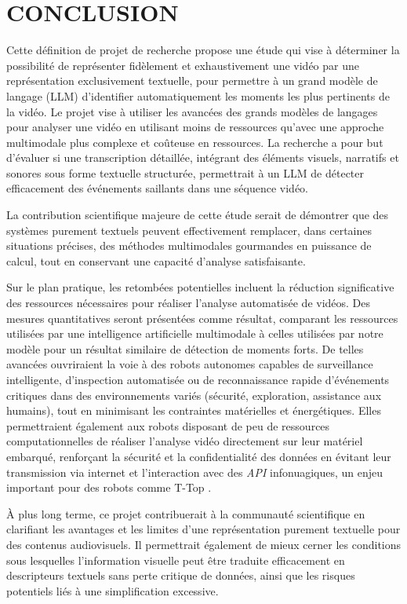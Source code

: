 \chapter{CONCLUSION}
Cette définition de projet de recherche propose une étude qui vise à déterminer la possibilité de représenter fidèlement et exhaustivement une vidéo par une représentation exclusivement textuelle, pour permettre à un grand modèle de langage (LLM) d'identifier automatiquement les moments les plus pertinents de la vidéo. Le projet vise à utiliser les avancées des grands modèles de langages pour analyser une vidéo en utilisant moins de ressources qu'avec une approche multimodale plus complexe et coûteuse en ressources. La recherche a pour but d'évaluer si une transcription détaillée, intégrant des éléments visuels, narratifs et sonores sous forme textuelle structurée, permettrait à un LLM de détecter efficacement des événements saillants dans une séquence vidéo. 

La contribution scientifique majeure de cette étude serait de démontrer que des systèmes purement textuels peuvent effectivement remplacer, dans certaines situations précises, des méthodes multimodales gourmandes en puissance de calcul, tout en conservant une capacité d'analyse satisfaisante. 

Sur le plan pratique, les retombées potentielles incluent la réduction significative des ressources nécessaires pour réaliser l'analyse automatisée de vidéos. Des mesures quantitatives seront présentées comme résultat, comparant les ressources utilisées par une intelligence artificielle multimodale à celles utilisées par notre modèle pour un résultat similaire de détection de moments forts. De telles avancées ouvriraient la voie à des robots autonomes capables de surveillance intelligente, d'inspection automatisée ou de reconnaissance rapide d'événements critiques dans des environnements variés (sécurité, exploration, assistance aux humains), tout en minimisant les contraintes matérielles et énergétiques. Elles permettraient également aux robots disposant de peu de ressources computationnelles de réaliser l’analyse vidéo directement sur leur matériel embarqué, renforçant la sécurité et la confidentialité des données en évitant leur transmission via internet et l’interaction avec des \textit{API} infonuagiques, un enjeu important pour des robots comme T-Top \cite{maheux2022_ttop}.

À plus long terme, ce projet contribuerait à la communauté scientifique en clarifiant les avantages et les limites d'une représentation purement textuelle pour des contenus audiovisuels. Il permettrait également de mieux cerner les conditions sous lesquelles l'information visuelle peut être traduite efficacement en descripteurs textuels sans perte critique de données, ainsi que les risques potentiels liés à une simplification excessive.


